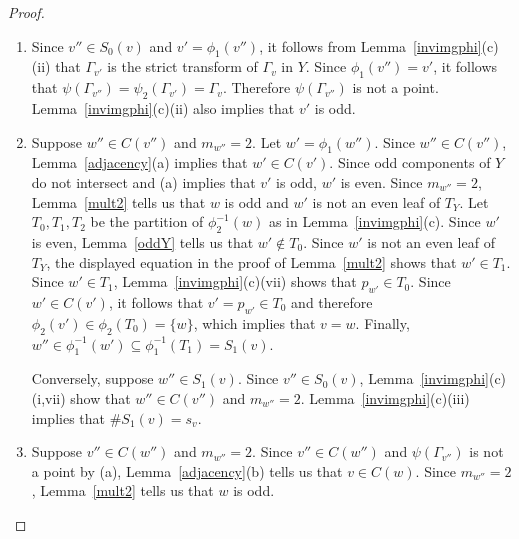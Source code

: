 \begin{proof} \hfill
 \begin{enumerate}[\upshape (a)]
  \item Since $v'' \in S_0(v)$ and $v' = \phi_1(v'')$, it follows from Lemma~\ref{invimgphi}(c)(ii) that $\Gamma_{v'}$ is the strict transform of $\Gamma_v$ in $Y$. Since $\phi_1(v'') = v'$, it follows that $\psi(\Gamma_{v''}) = \psi_2(\Gamma_{v'}) = \Gamma_v$. Therefore $\psi(\Gamma_{v''})$ is not a point. Lemma~\ref{invimgphi}(c)(ii) also implies that $v'$ is odd. 
 
  \item Suppose $w'' \in C(v'')$ and $m_{w''} = 2$. Let $w' = \phi_1(w'')$. Since $w'' \in C(v'')$, Lemma~\ref{adjacency}(a) implies that $w' \in C(v')$. Since odd components of $Y$ do not intersect and (a) implies that $v'$ is odd, $w'$ is even. Since $m_{w''} = 2$, Lemma~\ref{mult2} tells us that $w$ is odd and $w'$ is not an even leaf of $T_Y$. Let $T_0,T_1,T_2$ be the partition of $\phi_2^{-1}(w)$ as in Lemma~\ref{invimgphi}(c). Since $w'$ is even, Lemma~\ref{oddY} tells us that $w' \notin T_0$. Since $w'$ is not an even leaf of $T_Y$, the displayed equation in the proof of Lemma~\ref{mult2} shows that $w' \in T_1$. Since $w' \in T_1$, Lemma~\ref{invimgphi}(c)(vii) shows that $p_{w'} \in T_0$. Since $w' \in C(v')$, it follows that $v' = p_{w'} \in T_0$ and therefore $\phi_2(v') \in \phi_2(T_0) = \{w\}$, which implies that $v = w$. Finally, $w'' \in \phi_1^{-1}(w') \subseteq \phi_1^{-1}(T_1) = S_1(v)$.
  
  Conversely, suppose $w'' \in S_1(v)$. Since $v'' \in S_0(v)$, Lemma~\ref{invimgphi}(c)(i,vii) show that $w'' \in C(v'')$ and $m_{w''} = 2$. Lemma~\ref{invimgphi}(c)(iii) implies that $\# S_1(v) = s_v$.
  
  \item Suppose $v'' \in C(w'')$ and $m_{w''} = 2$. Since $v'' \in C(w'')$ and $\psi(\Gamma_{v''})$ is not a point by (a), Lemma~\ref{adjacency}(b) tells us that $v \in C(w)$. Since $m_{w''} = 2$, Lemma~\ref{mult2} tells us that $w$ is odd. 
  

\end{enumerate}
\end{proof}
